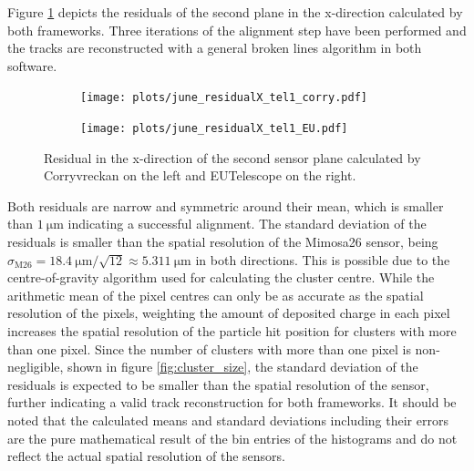 Figure \ref{fig:residualX} depicts the residuals of the second plane in the x-direction calculated by both frameworks. Three iterations
of the alignment step have been performed and the tracks are reconstructed with a general broken lines algorithm in both software.

\begin{figure}
  \hspace{-0.4cm}
  \begin{subfigure}{0.51\textwidth}
      \texttt{[image: plots/june\_residualX\_tel1\_corry.pdf]}
  \end{subfigure}
  \begin{subfigure}{0.51\textwidth}
      \hspace{-0.19cm}
      \texttt{[image: plots/june\_residualX\_tel1\_EU.pdf]}
  \end{subfigure}
  \caption{Residual in the x-direction of the second sensor plane calculated by Corryvreckan on the left and EUTelescope on the right.}
  \label{fig:residualX}
\end{figure}

Both residuals are narrow and symmetric around their mean, which is smaller than $\SI{1}{\micro\meter}$ indicating a successful
alignment. The standard deviation of the residuals is smaller than the spatial resolution of the Mimosa26 sensor, being
${\sigma_{\text{M26}} = \SI{18.4}{\micro\meter}/\sqrt{12} \approx \SI{5.311}{\micro\meter}}$ in both directions. This is possible due to
the centre-of-gravity algorithm used for calculating the cluster centre. While the arithmetic mean of the pixel centres can
only be as accurate as the spatial resolution of the pixels, weighting the amount of deposited charge in each pixel increases the
spatial resolution of the particle hit position for clusters with more than one pixel. Since the number of clusters with more than
one pixel is non-negligible, shown in figure \ref{fig:cluster_size}, the standard deviation of the residuals is expected to be
smaller than the spatial resolution of the sensor, further indicating a valid track reconstruction for both frameworks.
It should be noted that the calculated means and
standard deviations including their errors are the pure mathematical result of the bin entries of the histograms and do not reflect the actual
spatial resolution of the sensors. %

